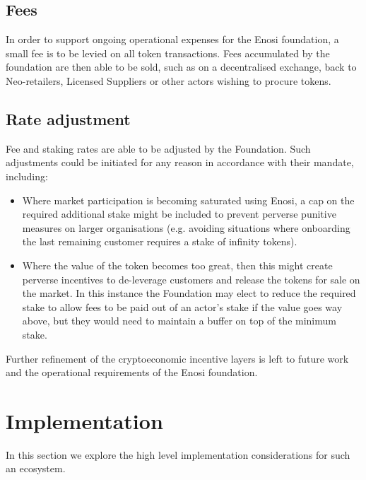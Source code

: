 \documentclass{article}
\theoremstyle{definition}
\theoremstyle{plain} %
\begin{document}
\subsection{Fees}

In order to support ongoing operational expenses for the Enosi foundation, a small fee is to be levied on all token transactions. Fees accumulated by the foundation are then able to be sold, such as on a decentralised exchange, back to Neo-retailers, Licensed Suppliers or other actors wishing to procure tokens.

\subsection{Rate adjustment}

Fee and staking rates are able to be adjusted by the Foundation. Such adjustments could be initiated for any reason in accordance with their mandate, including:

\begin{itemize}

\item{Where market participation is becoming saturated using Enosi, a cap on the required additional stake might be included to prevent perverse punitive measures on larger organisations (e.g. avoiding situations where onboarding the last remaining customer requires a stake of infinity tokens).}

\item{Where the value of the token becomes too great, then this might create perverse incentives to de-leverage customers and release the tokens for sale on the market. In this instance the Foundation may elect to reduce the required stake to allow fees to be paid out of an actor’s stake if the value goes way above, but they would need to maintain a buffer on top of the minimum stake.}

\end{itemize}

\noindent Further refinement of the cryptoeconomic incentive layers is left to future work and the operational requirements of the Enosi foundation.



\pagebreak
\section{Implementation}

In this section we explore the high level implementation considerations for such an ecosystem.
\end{document}

